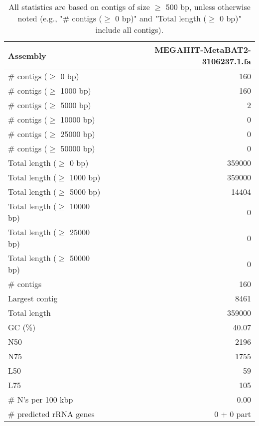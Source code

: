 \documentclass[12pt,a4paper]{article}
\begin{document}
\begin{table}[ht]
\begin{center}
\caption{All statistics are based on contigs of size $\geq$ 500 bp, unless otherwise noted (e.g., "\# contigs ($\geq$ 0 bp)" and "Total length ($\geq$ 0 bp)" include all contigs).}
\begin{tabular}{|l*{1}{|r}|}
\hline
Assembly & MEGAHIT-MetaBAT2-3106237.1.fa \\ \hline
\# contigs ($\geq$ 0 bp) & 160 \\ \hline
\# contigs ($\geq$ 1000 bp) & 160 \\ \hline
\# contigs ($\geq$ 5000 bp) & 2 \\ \hline
\# contigs ($\geq$ 10000 bp) & 0 \\ \hline
\# contigs ($\geq$ 25000 bp) & 0 \\ \hline
\# contigs ($\geq$ 50000 bp) & 0 \\ \hline
Total length ($\geq$ 0 bp) & 359000 \\ \hline
Total length ($\geq$ 1000 bp) & 359000 \\ \hline
Total length ($\geq$ 5000 bp) & 14404 \\ \hline
Total length ($\geq$ 10000 bp) & 0 \\ \hline
Total length ($\geq$ 25000 bp) & 0 \\ \hline
Total length ($\geq$ 50000 bp) & 0 \\ \hline
\# contigs & 160 \\ \hline
Largest contig & 8461 \\ \hline
Total length & 359000 \\ \hline
GC (\%) & 40.07 \\ \hline
N50 & 2196 \\ \hline
N75 & 1755 \\ \hline
L50 & 59 \\ \hline
L75 & 105 \\ \hline
\# N's per 100 kbp & 0.00 \\ \hline
\# predicted rRNA genes & 0 + 0 part \\ \hline
\end{tabular}
\end{center}
\end{table}
\end{document}
